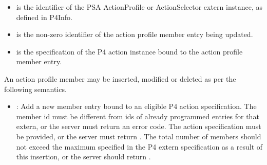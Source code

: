 \documentclass[11pt]{article}
\begin{document}
{%
\begin{itemize}%

\item{}
 is the  identifier of the PSA ActionProfile or
ActionSelector extern instance, as defined in P4Info.%

\item{}
 is the non-zero  identifier of the action profile member
entry being updated.%

\item{}
 is the specification of the P4 action instance bound to the action
profile member entry.%
\end{itemize}%

\noindent{}An action profile member may be inserted, modified or deleted as per the
following semantics.%

\begin{itemize}[noitemsep,topsep=\mdcompacttopsep]%

\item{}: Add a new member entry bound to an eligible P4 action
specification. The member id must be different from ids of already programmed
entries for that extern, or the server must return an  error
code. The action specification must be provided, or the server must return
. The total number of members should not exceed the maximum
specified in the P4 extern specification as a result of this insertion, or the
server should return .%


\end{itemize}}
\end{document}
